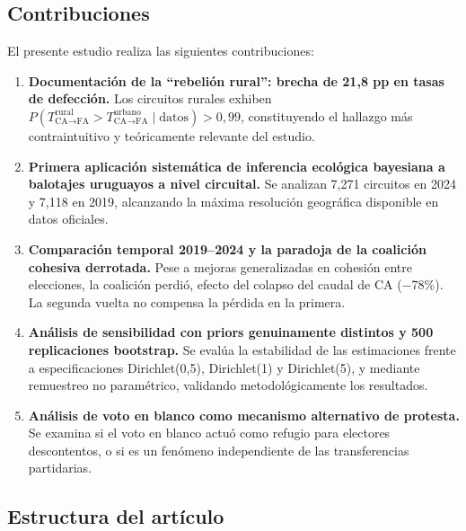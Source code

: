 \subsection{Contribuciones}

El presente estudio realiza las siguientes contribuciones:

\begin{enumerate}
    \item \textbf{Documentación de la ``rebelión rural'': brecha de 21{,}8 pp en tasas de defección.} Los circuitos rurales exhiben $P(T_{\text{CA}\to\text{FA}}^{\text{rural}} > T_{\text{CA}\to\text{FA}}^{\text{urbano}} \mid \text{datos}) > 0{,}99$, constituyendo el hallazgo más contraintuitivo y teóricamente relevante del estudio.

    \item \textbf{Primera aplicación sistemática de inferencia ecológica bayesiana a balotajes uruguayos a nivel circuital.} Se analizan 7{,}271 circuitos en 2024 y 7{,}118 en 2019, alcanzando la máxima resolución geográfica disponible en datos oficiales.

    \item \textbf{Comparación temporal 2019--2024 y la paradoja de la coalición cohesiva derrotada.} Pese a mejoras generalizadas en cohesión entre elecciones, la coalición perdió, efecto del colapso del caudal de CA ($-$78\%). La segunda vuelta no compensa la pérdida en la primera.

    \item \textbf{Análisis de sensibilidad con priors genuinamente distintos y 500 replicaciones bootstrap.} Se evalúa la estabilidad de las estimaciones frente a especificaciones Dirichlet(0{,}5), Dirichlet(1) y Dirichlet(5), y mediante remuestreo no paramétrico, validando metodológicamente los resultados.

    \item \textbf{Análisis de voto en blanco como mecanismo alternativo de protesta.} Se examina si el voto en blanco actuó como refugio para electores descontentos, o si es un fenómeno independiente de las transferencias partidarias.
\end{enumerate}

\subsection{Estructura del artículo}


